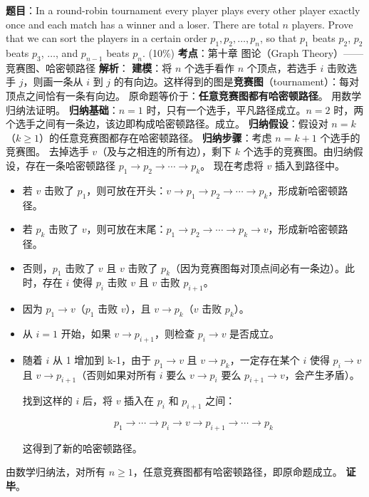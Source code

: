 \documentclass[10pt,a4paper,openany]{ctexbook}
\theoremstyle{definition}
\theoremstyle{remark}
\begin{document}
\textbf{题目}：In a round-robin tournament every player plays every other player exactly once and each match has a winner and a loser. There are total $n$ players. Prove that we can sort the players in a certain order $p_1, p_2, \ldots, p_n$, so that $p_1$ beats $p_2$, $p_2$ beats $p_3$, $\ldots$, and $p_{n-1}$ beats $p_n$. (10\%)
\textbf{考点}：第十章 图论（Graph Theory）—— 竞赛图、哈密顿路径
\textbf{解析}：
\textbf{建模}：将 $n$ 个选手看作 $n$ 个顶点，若选手 $i$ 击败选手 $j$，则画一条从 $i$ 到 $j$ 的有向边。这样得到的图是\textbf{竞赛图}（tournament）：每对顶点之间恰有一条有向边。
原命题等价于：\textbf{任意竞赛图都有哈密顿路径}。
用数学归纳法证明。
\textbf{归纳基础}：$n = 1$ 时，只有一个选手，平凡路径成立。$n = 2$ 时，两个选手之间有一条边，该边即构成哈密顿路径。成立。
\textbf{归纳假设}：假设对 $n = k$（$k \geq 1$）的任意竞赛图都存在哈密顿路径。
\textbf{归纳步骤}：考虑 $n = k + 1$ 个选手的竞赛图。
去掉选手 $v$（及与之相连的所有边），剩下 $k$ 个选手的竞赛图。由归纳假设，存在一条哈密顿路径 $p_1 \to p_2 \to \cdots \to p_k$。
现在考虑将 $v$ 插入到路径中。
\begin{itemize}
\item 若 $v$ 击败了 $p_1$，则可放在开头：$v \to p_1 \to p_2 \to \cdots \to p_k$，形成新哈密顿路径。
\item 若 $p_k$ 击败了 $v$，则可放在末尾：$p_1 \to p_2 \to \cdots \to p_k \to v$，形成新哈密顿路径。
\item 否则，$p_1$ 击败了 $v$ 且 $v$ 击败了 $p_k$（因为竞赛图每对顶点间必有一条边）。此时，存在 $i$ 使得 $p_i$ 击败 $v$ 且 $v$ 击败 $p_{i+1}$。
\item 因为 $p_1 \to v$（$p_1$ 击败 $v$），且 $v \to p_k$（$v$ 击败 $p_k$）。
\item 从 $i=1$ 开始，如果 $v \to p_{i+1}$，则检查 $p_i \to v$ 是否成立。
\item 随着 $i$ 从 1 增加到 k-1，由于 $p_1 \to v$ 且 $v \to p_k$，一定存在某个 $i$ 使得 $p_i \to v$ 且 $v \to p_{i+1}$（否则如果对所有 $i$ 要么 $v \to p_i$ 要么 $p_{i+1} \to v$，会产生矛盾）。

找到这样的 $i$ 后，将 $v$ 插入在 $p_i$ 和 $p_{i+1}$ 之间：

\[
  p_1 \to \cdots \to p_i \to v \to p_{i+1} \to \cdots \to p_k
\]


这得到了新的哈密顿路径。


\end{itemize}

由数学归纳法，对所有 $n \geq 1$，任意竞赛图都有哈密顿路径，即原命题成立。
\textbf{证毕}。
\vspace{-2pt}
\end{document}
